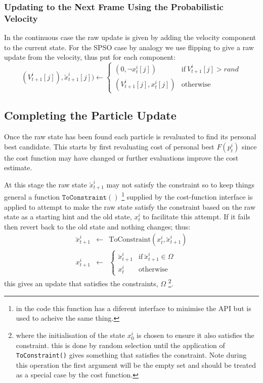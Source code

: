 \documentclass[a4paper,oneside,english]{book}
\numberwithin{equation}{section}
\numberwithin{figure}{section}
\begin{document}
\subsubsection{Updating to the Next Frame Using the Probabilistic Velocity}
In the continuous case the raw update is given by adding the velocity component to the current state. For the SPSO case by analogy we use flipping to give a raw update from the velocity,
thus put for each component:
\begin{equation}\label{raw_update}
(V_{t+1}^i[j]),\breve{x}_{t+1}^i[j]) \leftarrow\left\lbrace 
\begin{array}{cc}
(0,\neg x_t^i[j])&\mathrm{if}\:V_{t+1}^i[j]>rand \\
(V_{t+1}^i[j],x_t^i[j])&\mathrm{otherwise}
\end{array}\right.
\end{equation}
 
\subsection{Completing the Particle Update}
Once  the raw state has been found each particle is revaluated to find its personal best candidate. This  starts by first revaluating cost of personal best $F(p^i_t)$ since the cost function may have changed or further evaluations improve the  cost estimate.

At this stage the raw state $\breve{x}_{t+1}^i$ may not satisfy the constraint so to keep things general a function $\mathtt{ToConstraint()}$ \footnote{in the code this function has a diferent interface to minimise the API but is used to acheive the same thing.} supplied by the cost-function interface is applied  to attempt to make the raw state  satisfy the constraint based on the raw state as a starting hint and the old state, $x_t^i$ to facilitate this attempt. If it fails then revert back to the old state and nothing changes; thus: 
\begin{align}
\breve{x}_{t+1}^i&\leftarrow&\mathrm{ToConstraint}(x_t^i,\breve{x}_{t+1}^i)\\
x_{t+1}^i &\leftarrow& \left\lbrace
\begin{array}{cc}
\breve{x}_{t+1}^i & \mathrm{if}\: \breve{x}_{t+1}^i \in \Omega\\
x_t^i&\mathrm{otherwise}
\end{array}\right.
\end{align} 
this gives an update that satisfies the constraints, $\Omega$ \footnote{where  the initialisation of the state $x_0^i$ is chosen to ensure it also satisfies the constraint. this is done by random selection until the application of  \texttt{ToConstraint()} gives something that satisfies the constraint. Note during this operation the first argument will be the empty set and should be treated as a special case by the cost function.}.
\end{document}
